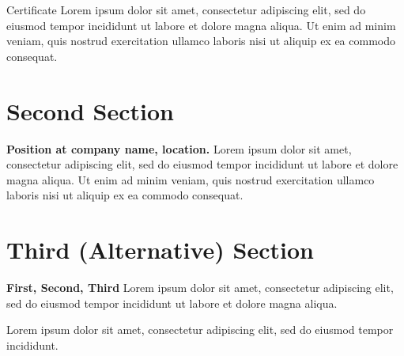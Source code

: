 \par{\par} %

{Certificate}
{Lorem ipsum dolor sit amet, consectetur adipiscing elit, sed do eiusmod tempor incididunt ut labore et dolore magna aliqua. Ut enim ad minim veniam, quis nostrud exercitation ullamco laboris nisi ut aliquip ex ea commodo consequat.}
{}

\section{Second Section} %

{\textbf{Position at company name, location.}}
{Lorem ipsum dolor sit amet, consectetur adipiscing elit, sed do eiusmod tempor incididunt ut labore et dolore magna aliqua. Ut enim ad minim veniam, quis nostrud exercitation ullamco laboris nisi ut aliquip ex ea commodo consequat.}
{}

\section{Third (Alternative) Section} %

{\textbf{First, Second, Third}}
{Lorem ipsum dolor sit amet, consectetur adipiscing elit, sed do eiusmod tempor incididunt ut labore et dolore magna aliqua.}
{}

{Lorem ipsum dolor sit amet, consectetur adipiscing elit, sed do eiusmod tempor incididunt.}
{}
\unsetLTR 